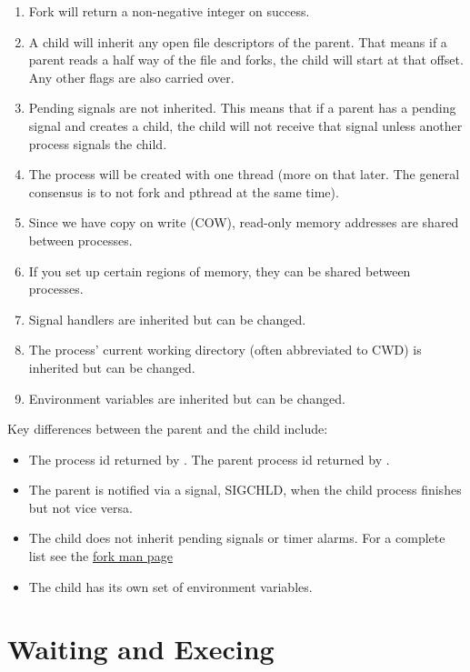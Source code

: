 \begin{itemize}
\begin{enumerate}
    \item Fork will return a non-negative integer on success.
    \item A child will inherit any open file descriptors of the parent.
          That means if a parent reads a half way of the file and forks, the child will start at that offset.
          Any other flags are also carried over.
    \item Pending signals are not inherited.
          This means that if a parent has a pending signal and creates a child, the child will not receive that signal unless another process signals the child.
    \item The process will be created with one thread (more on that later. The general consensus is to not fork and pthread at the same time).
    \item Since we have copy on write (COW), read-only memory addresses are shared between processes.
    \item If you set up certain regions of memory, they can be shared between processes.
    \item Signal handlers are inherited but can be changed.
    \item The process' current working directory (often abbreviated to CWD) is inherited but can be changed.
    \item Environment variables are inherited but can be changed.
\end{enumerate}

Key differences between the parent and the child include:
\begin{itemize}
    \item The process id returned by .
          The parent process id returned by .
    \item The parent is notified via a signal, SIGCHLD, when the child process finishes but not vice versa.
    \item The child does not inherit pending signals or timer alarms.
          For a complete list see the \href{http://man7.org/linux/man-pages/man2/fork.2.html}{fork man page}
    \item The child has its own set of environment variables.
\end{itemize}

\section{Waiting and Execing}


\end{itemize}
